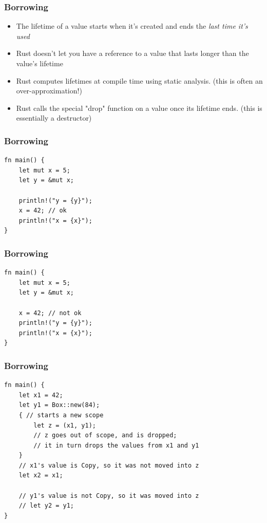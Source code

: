 \documentclass[aspectratio=1610,t]{beamer}
\begin{document}

\begin{frame}[fragile]
\frametitle{Borrowing}
\begin{itemize}
    \item The lifetime of a value starts when it's created and ends the \textit{last time it's used}
    \item Rust doesn't let you have a reference to a value that lasts longer than the value's lifetime
    \item Rust computes lifetimes at compile time using static analysis. (this is often an over-approximation!)
    \item Rust calls the special "drop" function on a value once its lifetime ends. (this is essentially a destructor)
\end{itemize}
\end{frame}


\begin{frame}[fragile]
\frametitle{Borrowing}
\begin{verbatim}
fn main() {
    let mut x = 5;
    let y = &mut x;
    
    println!("y = {y}");
    x = 42; // ok
    println!("x = {x}");
}
\end{verbatim}
\end{frame}


\begin{frame}[fragile]
\frametitle{Borrowing}
\begin{verbatim}
fn main() {
    let mut x = 5;
    let y = &mut x;

    x = 42; // not ok
    println!("y = {y}");
    println!("x = {x}");
}
\end{verbatim}
\end{frame}


\begin{frame}[fragile]
\frametitle{Borrowing}
\begin{verbatim}
fn main() {
    let x1 = 42;
    let y1 = Box::new(84);
    { // starts a new scope
        let z = (x1, y1);
        // z goes out of scope, and is dropped;
        // it in turn drops the values from x1 and y1
    }
    // x1's value is Copy, so it was not moved into z
    let x2 = x1;
    
    // y1's value is not Copy, so it was moved into z
    // let y2 = y1;
}
\end{verbatim}
\end{frame}
\end{document}
